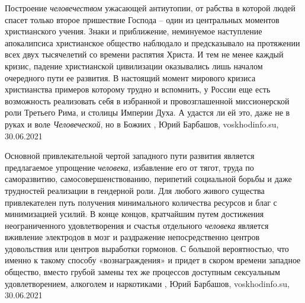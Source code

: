Построение \emph{человечеством} ужасающей антиутопии, от рабства в которой людей
спасет только второе пришествие Господа – один из центральных моментов
христианского учения. Знаки и приближение, неминуемое наступление апокалипсиса
христианское общество наблюдало и предсказывало на протяжении всех двух
тысячелетий со времени распятия Христа. И тем не менее каждый кризис, падение
христианской цивилизации оказывались лишь началом очередного пути ее развития.
В настоящий момент мирового кризиса христианства примеров которому трудно и
вспомнить, у России еще есть возможность реализовать себя в избранной и
провозглашенной миссионерской роли Третьего Рима, и столицы Империи Духа.  А
удастся ли ей это, даже не в руках и воле \emph{Человеческой}, но в Божиих
, 
Юрий Барбашов, voskhodinfo.su, 30.06.2021

Основной привлекательной чертой западного пути развития является предлагаемое
упрощение \emph{человека}, избавление его от тягот, труда по саморазвитию,
самосовершенствованию, перипетий социальной борьбы и даже трудностей реализации
в гендерной роли. Для любого живого существа привлекателен путь получения
минимального количества ресурсов и благ с минимизацией усилий. В конце концов,
кратчайшим путем достижения неограниченного удовлетворения и счастья отдельного
\emph{человека} является вживление электродов в мозг и раздражение непосредственно
центров удовольствия или центров выработки гормонов. С большой вероятностью,
что именно к такому способу «вознаграждения» и придет в скором времени западное
общество, вместо грубой замены тех же процессов доступным сексуальным
удовлетворением, алкоголем и наркотиками
, 
Юрий Барбашов, voskhodinfo.su, 30.06.2021
